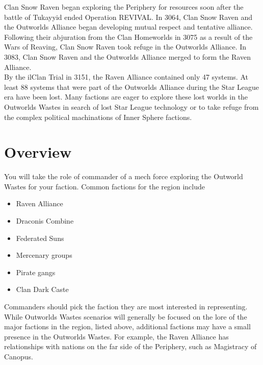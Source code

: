\documentclass[UTF8]{article}
\begin{document}
Clan Snow Raven began exploring the Periphery for resources soon after the battle of Tukayyid ended Operation REVIVAL.
In 3064, Clan Snow Raven and the Outworlds Alliance began developing mutual respect and tentative alliance.
Following their abjuration from the Clan Homeworlds in 3075 as a result of the Wars of Reaving, Clan Snow Raven took refuge in the Outworlds Alliance.
In 3083, Clan Snow Raven and the Outworlds Alliance merged to form the Raven Alliance.\\

By the ilClan Trial in 3151, the Raven Alliance contained only 47 systems.
At least 88 systems that were part of the Outworlds Alliance during the Star League era have been lost.
Many factions are eager to explore these lost worlds in the Outworlds Wastes in search of lost Star League technology or to take refuge from the complex political machinations of Inner Sphere factions.\\

\section{Overview}

You will take the role of commander of a mech force exploring the Outworld Wastes for your faction.
Common factions for the region include

\begin{itemize}

\item Raven Alliance

\item Draconis Combine

\item Federated Suns

\item Mercenary groups

\item Pirate gangs

\item Clan Dark Caste

\end{itemize}

Commanders should pick the faction they are most interested in representing.
While Outworlds Wastes scenarios will generally be focused on the lore of the major factions in the region, listed above, additional factions may have a small presence in the Outworlds Wastes.
For example, the Raven Alliance has relationships with nations on the far side of the Periphery, such as Magistracy of Canopus.\\
\end{document}
